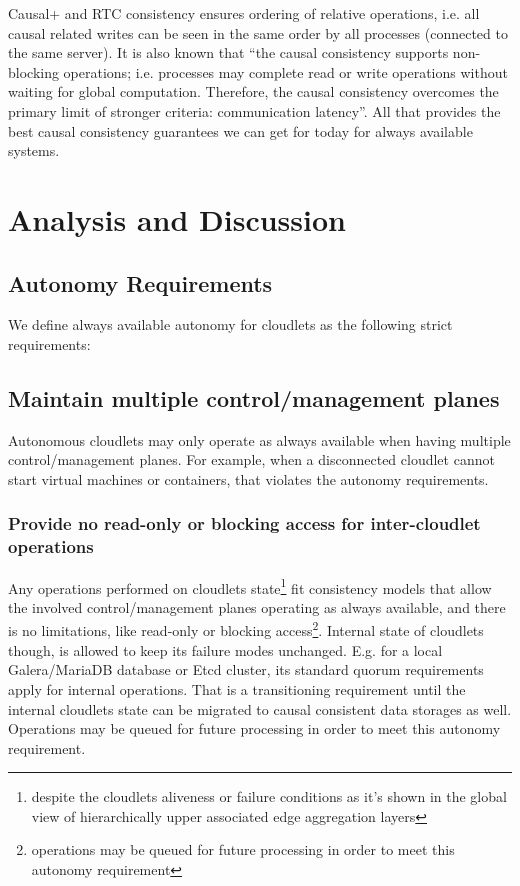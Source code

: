\documentclass[conference]{IEEEtran}
\begin{document}
Causal+ and RTC consistency ensures ordering of relative operations, i.e. all
causal related writes can be seen in the same order by all processes
(connected to the same server). It is also known that ``the causal consistency
supports non-blocking operations; i.e. processes may complete read or write
operations without waiting for global computation. Therefore, the causal
consistency overcomes the primary limit of stronger criteria: communication
latency''\cite{b6}. All that provides the best causal consistency guarantees we
can get for today for always available systems.

\section{Analysis and Discussion}

\subsection{Autonomy Requirements}

We define always available autonomy for cloudlets as the following strict
requirements:

\subsection{Maintain multiple control/management planes}

Autonomous cloudlets may only operate as always available when having multiple
control/management planes. For example, when a disconnected cloudlet cannot
start virtual machines or containers, that violates the autonomy requirements.

\subsubsection{Provide no read-only or blocking access for inter-cloudlet
operations}

Any operations performed on cloudlets state\footnote{despite the cloudlets
aliveness or failure conditions as it's shown in the global view of
hierarchically upper associated edge aggregation layers} fit consistency models
that allow the involved control/management planes operating as always
available, and there is no limitations, like read-only or blocking
access\footnote{operations may be queued for future processing in order to meet
this autonomy requirement}. Internal state of cloudlets though, is allowed to
keep its failure modes unchanged. E.g. for a local Galera/MariaDB database or
Etcd cluster, its standard quorum requirements apply for internal operations.
That is a transitioning requirement until the internal cloudlets state can be
migrated to causal consistent data storages as well. Operations may be queued
for future processing in order to meet this autonomy requirement.
\end{document}

